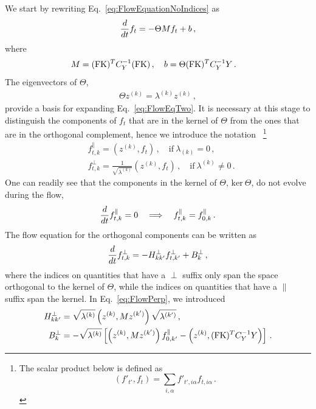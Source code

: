 \documentclass[11pt]{article}
\begin{document}
We start by rewriting Eq.~\eqref{eq:FlowEquationNoIndices} as
\begin{align}
    \label{eq:FlowEqTwo}
    \frac{d}{dt} f_t = -\Theta M f_t + b\, ,
\end{align}
where
\begin{align}
    M &= (\mathrm{FK})^T C_Y^{-1} (\mathrm{FK})\, , \quad b = \Theta (\mathrm{FK})^T C_Y^{-1} Y\, .
\end{align}
The eigenvectors of $\Theta$,
\begin{align}
    \label{eq:ThetaEigensystem}
    \Theta z^{(k)} = \lambda^{(k)} z^{(k)}\, ,
\end{align}
provide a basis for expanding Eq.~\eqref{eq:FlowEqTwo}. It is necessary at this stage to distinguish
the components of $f_t$ that are in the kernel of $\Theta$ from the ones that are in the orthogonal
complement, hence we introduce the notation
~\footnote{
    The scalar product below is defined as
    \[
        \left(f'_{t'}, f_t\right)
            = \sum_{i,\alpha} f'_{t',i\alpha} f_{t,i\alpha}\, .
    \]
}
\begin{align}
    &f^\parallel_{t,k} = \left(z^{(k)}, f_t\right)\, , \quad \text{if}\ \lambda_{(k)} = 0\, , \\
    &f^\perp_{t,k} = \frac{1}{\sqrt{\lambda^{(k)}}} \left(z^{(k)}, f_t\right)\, , \quad
        \text{if}\ \lambda^{(k)} \neq 0\, .
\end{align}
One can readily see that the components in the kernel of $\Theta$, $\text{ker}\ \Theta$,
do not evolve during the flow,
\begin{align}
    \label{eq:FlowParallel}
    \frac{d}{dt} f^\parallel_{t,k} = 0
        \quad \Longrightarrow \quad f^\parallel_{t,k} = f^\parallel_{0,k}\, .
\end{align}
The flow equation for the orthogonal components can be written as
\begin{align}
    \label{eq:FlowPerp}
    \frac{d}{dt} f^\perp_{t,k} = - H^\perp_{kk'} f^\perp_{t,k'}
        + B^\perp_{k}\, ,
\end{align}
where the indices on quantities that have a $\perp$ suffix only span the space orthogonal to the kernel
of $\Theta$, while the indices on quantities that have a $\parallel$ suffix span the kernel.
In Eq.~\eqref{eq:FlowPerp}, we introduced
\begin{align}
    H^\perp_{kk'} &= \sqrt{\lambda^{(k)}} \left(z^{(k)}, M z^{(k')}\right) \sqrt{\lambda^{(k')}}\, ,\\
    B^\perp_k &= -\sqrt{\lambda^{(k)}} \left[\left(z^{(k)}, M z^{(k')}\right) f^\parallel_{0,k'}
        - \left(z^{(k)}, (\mathrm{FK})^T C_Y^{-1} Y\right)\right]\, .
\end{align}
\end{document}
